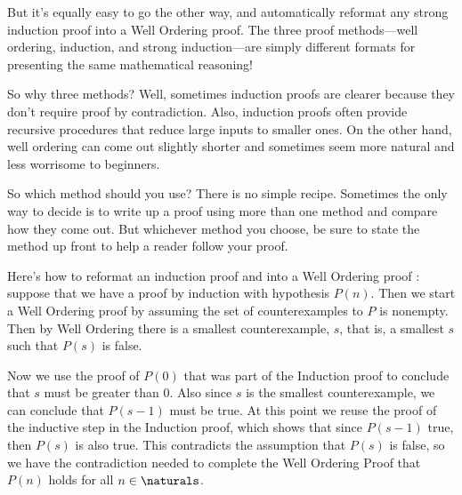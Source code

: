 But it's equally easy to go the other way, and automatically reformat
any strong induction proof into a Well Ordering proof.  The three
proof methods---well ordering, induction, and strong induction---are
simply different formats for presenting the same mathematical
reasoning!

So why three methods?  Well, sometimes induction proofs are clearer
because they don't require proof by contradiction.  Also, induction
proofs often provide recursive procedures that reduce large inputs to
smaller ones.  On the other hand, well ordering can come out slightly
shorter and sometimes seem more natural and less worrisome to
beginners.

So which method should you use?  There is no simple recipe.  Sometimes
the only way to decide is to write up a proof using more than one
method and compare how they come out.  But whichever method you
choose, be sure to state the method up front to help a reader follow
your proof.

\begin{editingnotes}
Here's how to reformat an induction proof and into a Well
Ordering proof : suppose that we have a proof by induction with
hypothesis $P(n)$.  Then we start a Well Ordering proof by assuming the
set of counterexamples to $P$ is nonempty.  Then by Well Ordering there is
a smallest counterexample, $s$, that is, a smallest $s$ such that $P(s)$
is false.

Now we use the proof of $P(0)$ that was part of the Induction proof to
conclude that $s$ must be greater than 0.  Also since $s$ is the smallest
counterexample, we can conclude that $P(s-1)$ must be true.  At this point
we reuse the proof of the inductive step in the Induction proof, which
shows that since $P(s-1)$ true, then $P(s)$ is also true.  This
contradicts the assumption that $P(s)$ is false, so we have the
contradiction needed to complete the Well Ordering Proof that $P(n)$ holds
for all $n \in \naturals$.

\end{editingnotes}

\endinput
